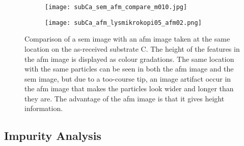 \begin{figure}[htbp]
    \centering
    \begin{subfigure}[t]{0.45\linewidth}
        \texttt{[image: subCa\_sem\_afm\_compare\_m010.jpg]}
        \caption{}\label{fig:sem-afm-comparison_sem}
    \end{subfigure}%
    \begin{subfigure}[t]{0.45\linewidth}
        \texttt{[image: subCa\_afm\_lysmikrokopi05\_afm02.png]}
        \caption{}\label{fig:sem-afm-comparison_afm}
    \end{subfigure}%
    \caption[Comparison of an \ac{afm} image with a \ac{sem} image taken at the same location on substrate C.]{Comparison of  a \ac{sem} image with  an \ac{afm} image taken at the same location on the as-received substrate C. The height of the features in the \ac{afm} image is displayed as colour gradations. The same location with the same particles can be seen in both the \ac{afm} image and the \ac{sem} image, but due to a too-course tip, an image artifact occur in the \ac{afm} image that makes the particles look wider and longer than they are. The advantage of the \ac{afm} image is that it gives height information.}
    \label{fig:sem-afm-comparison}
\end{figure}


\subsection{Impurity Analysis}

